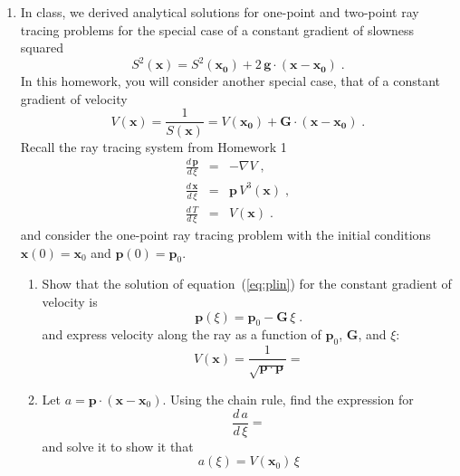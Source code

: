\begin{enumerate}

\item In class, we derived analytical solutions for one-point and
two-point ray tracing problems for the special case of a constant
gradient of slowness squared 
\begin{equation}
  \label{eq:s2}
  S^2(\mathbf{x}) =
  S^2(\mathbf{x_0})+2\,\mathbf{g} \cdot (\mathbf{x}-\mathbf{x_0})\;.
\end{equation}
In this homework, you will consider another special case, that of a
constant gradient of velocity
\begin{equation}
  V(\mathbf{x}) = {\frac{1}{S(\mathbf{x})}} =
  {V(\mathbf{x_0})+\mathbf{G} \cdot (\mathbf{x}-\mathbf{x_0})}\;.
  \label{eq:v}
\end{equation}
Recall the ray tracing system from Homework 1
\begin{eqnarray}
  \label{eq:plin}
  \frac{d\,\mathbf{p}}{d\,\xi} & = & -\nabla V\;, \\
  \label{eq:xlin}
  \frac{d\,\mathbf{x}}{d\,\xi} & = &
  \mathbf{p}\,V^3(\mathbf{x})\;, \\
  \label{eq:tlin}
  \frac{d\,T}{d\,\xi} & = & V(\mathbf{x})\;.
\end{eqnarray}
and consider the one-point ray tracing problem with the initial conditions
$\mathbf{x}(0)= \mathbf{x}_0$ and $\mathbf{p}(0)=\mathbf{p}_0$.
\begin{enumerate}
\item  Show that the solution of
equation~(\ref{eq:plin}) for the constant gradient of velocity is
\begin{equation}
  \label{eq:pcir}
  \mathbf{p}(\xi) =  \mathbf{p}_0 - \mathbf{G}\,\xi\;.
\end{equation}
and express velocity along the ray as a function of
  $\mathbf{p}_0$, $\mathbf{G}$, and $\xi$:
  \begin{equation}
\label{eq:vsol}
V(\mathbf{x}) = \frac{1}{\sqrt{\mathbf{p} \cdot \mathbf{p}}} = 
\end{equation}
\item Let $a = \mathbf{p} \cdot (\mathbf{x} - \mathbf{x}_0)$. Using
  the chain rule, find the expression for
  \begin{equation}
    \frac{d\,a}{d\,\xi} = 
  \end{equation}
  and solve it to show it that 
  \begin{equation}
    \label{eq:asol}
    a(\xi) = V(\mathbf{x}_0)\,\xi
  \end{equation}

\end{enumerate}
\end{enumerate}
